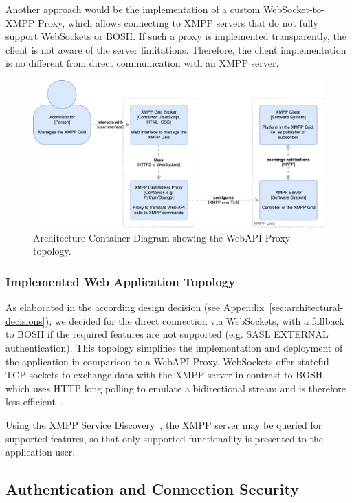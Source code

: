 Another approach would be the implementation of a custom WebSocket-to-XMPP Proxy, which allows connecting to XMPP servers that do not fully support WebSockets or BOSH.
If such a proxy is implemented transparently, the client is not aware of the server limitations. Therefore, the client implementation is no different from direct communication with an XMPP server.

\begin{figure}[h]
\centering
\includegraphics[width=\linewidth]{resources/architecture_container_proxy.pdf}
\caption[Architecture Container Diagram: Web Proxy]{Architecture Container Diagram showing the WebAPI Proxy topology.}
\label{fig:architecturecontainerwebproxy}
\end{figure}

\subsubsection{Implemented Web Application Topology}

As elaborated in the according design decision (see Appendix~\ref{sec:architectural-decisions}), we decided for the direct connection via WebSockets, with a fallback to BOSH if the required features are not supported (e.g. SASL EXTERNAL authentication).
This topology simplifies the implementation and deployment of the application in comparison to a WebAPI Proxy.
WebSockets offer stateful TCP-sockets to exchange data with the XMPP server in contrast to BOSH, which uses HTTP long polling to emulate a bidirectional stream and is therefore less efficient~\cite{xep-0124}.

Using the XMPP Service Discovery~\cite{xep-0030}, the XMPP server may be queried for supported features, so that only supported functionality is presented to the application user.

\subsection{Authentication and Connection Security}

